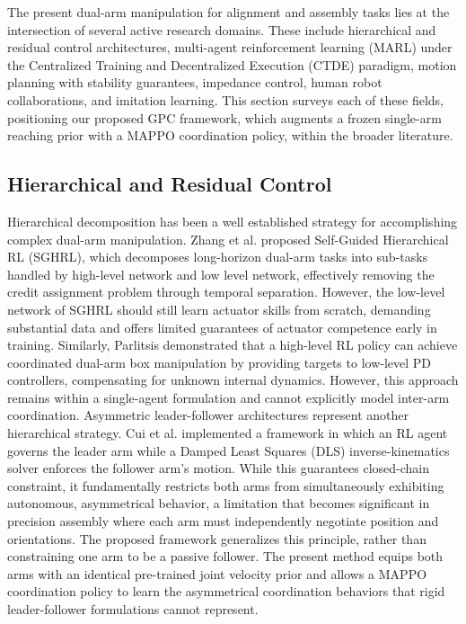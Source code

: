 \documentclass[a4paper,fleqn]{cas-dc}
\begin{document}
The present dual-arm manipulation for alignment and assembly tasks lies at the intersection of several active research domains. These include hierarchical and residual control architectures, multi-agent reinforcement learning (MARL) under the Centralized Training and Decentralized Execution (CTDE) paradigm, motion planning with stability guarantees, impedance control, human robot collaborations, and imitation learning. This section surveys each of these fields, positioning our proposed GPC framework, which augments a frozen single-arm reaching prior with a MAPPO coordination policy, within the broader literature.

\subsection{Hierarchical and Residual Control}
Hierarchical decomposition has been a well established strategy for accomplishing complex dual-arm manipulation. Zhang et al. \cite{related-37} proposed Self-Guided Hierarchical RL (SGHRL), which decomposes long-horizon dual-arm tasks into sub-tasks handled by high-level network and low level network, effectively removing the credit assignment problem through temporal separation. However, the low-level network of SGHRL should still learn actuator skills from scratch, demanding substantial data and offers limited guarantees of actuator competence early in training. Similarly, Parlitsis \cite{related-38} demonstrated that a high-level RL policy can achieve coordinated dual-arm box manipulation by providing targets to low-level PD controllers, compensating for unknown internal dynamics. However, this approach remains within a single-agent formulation and cannot explicitly model inter-arm coordination. Asymmetric leader-follower architectures represent another hierarchical strategy. Cui et al. \cite{related-39} implemented a framework in which an RL agent governs the leader arm while a Damped Least Squares (DLS) inverse-kinematics solver enforces the follower arm's motion. While this guarantees closed-chain constraint, it fundamentally restricts both arms from simultaneously exhibiting autonomous, asymmetrical behavior, a limitation that becomes significant in precision assembly where each arm must independently negotiate position and orientations. The proposed framework generalizes this principle, rather than constraining one arm to be a passive follower. The present method equips both arms with an identical pre-trained joint velocity prior and allows a MAPPO coordination policy to learn the asymmetrical coordination behaviors that rigid leader-follower formulations cannot represent.
\end{document}
